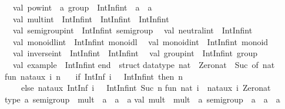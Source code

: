 \begin{isabellebody}
\begin{isamarkuptext}
\ \ val\ pow{\isacharunderscore}int\ {\isacharcolon}\ {\isacharprime}a\ group\ {\isacharminus}{\isachargreater}\ IntInf{\isachardot}int\ {\isacharminus}{\isachargreater}\ {\isacharprime}a\ {\isacharminus}{\isachargreater}\ {\isacharprime}a\isanewline
\ \ val\ mult{\isacharunderscore}int\ {\isacharcolon}\ IntInf{\isachardot}int\ {\isacharminus}{\isachargreater}\ IntInf{\isachardot}int\ {\isacharminus}{\isachargreater}\ IntInf{\isachardot}int\isanewline
\ \ val\ semigroup{\isacharunderscore}int\ {\isacharcolon}\ IntInf{\isachardot}int\ semigroup\isanewline
\ \ val\ neutral{\isacharunderscore}int\ {\isacharcolon}\ IntInf{\isachardot}int\isanewline
\ \ val\ monoidl{\isacharunderscore}int\ {\isacharcolon}\ IntInf{\isachardot}int\ monoidl\isanewline
\ \ val\ monoid{\isacharunderscore}int\ {\isacharcolon}\ IntInf{\isachardot}int\ monoid\isanewline
\ \ val\ inverse{\isacharunderscore}int\ {\isacharcolon}\ IntInf{\isachardot}int\ {\isacharminus}{\isachargreater}\ IntInf{\isachardot}int\isanewline
\ \ val\ group{\isacharunderscore}int\ {\isacharcolon}\ IntInf{\isachardot}int\ group\isanewline
\ \ val\ example\ {\isacharcolon}\ IntInf{\isachardot}int\isanewline
end\ {\isacharequal}\ struct\isanewline
\isanewline
datatype\ nat\ {\isacharequal}\ Zero{\isacharunderscore}nat\ {\isacharbar}\ Suc\ of\ nat{\isacharsemicolon}\isanewline
\isanewline
fun\ nat{\isacharunderscore}aux\ i\ n\ {\isacharequal}\isanewline
\ \ {\isacharparenleft}if\ IntInf{\isachardot}{\isacharless}{\isacharequal}\ {\isacharparenleft}i{\isacharcomma}\ {\isacharparenleft}{}\ {\isacharcolon}\ IntInf{\isachardot}int{\isacharparenright}{\isacharparenright}\ then\ n\isanewline
\ \ \ \ else\ nat{\isacharunderscore}aux\ {\isacharparenleft}IntInf{\isachardot}{\isacharminus}\ {\isacharparenleft}i{\isacharcomma}\ {\isacharparenleft}{}\ {\isacharcolon}\ IntInf{\isachardot}int{\isacharparenright}{\isacharparenright}{\isacharparenright}\ {\isacharparenleft}Suc\ n{\isacharparenright}{\isacharparenright}{\isacharsemicolon}\isanewline
\isanewline
fun\ nat\ i\ {\isacharequal}\ nat{\isacharunderscore}aux\ i\ Zero{\isacharunderscore}nat{\isacharsemicolon}\isanewline
\isanewline
type\ {\isacharprime}a\ semigroup\ {\isacharequal}\ {\isacharbraceleft}mult\ {\isacharcolon}\ {\isacharprime}a\ {\isacharminus}{\isachargreater}\ {\isacharprime}a\ {\isacharminus}{\isachargreater}\ {\isacharprime}a{\isacharbraceright}{\isacharsemicolon}\isanewline
val\ mult\ {\isacharequal}\ {\isacharhash}mult\ {\isacharcolon}\ {\isacharprime}a\ semigroup\ {\isacharminus}{\isachargreater}\ {\isacharprime}a\ {\isacharminus}{\isachargreater}\ {\isacharprime}a\ {\isacharminus}{\isachargreater}\ {\isacharprime}a{\isacharsemicolon}\isanewline

\end{isamarkuptext}
\end{isabellebody}
